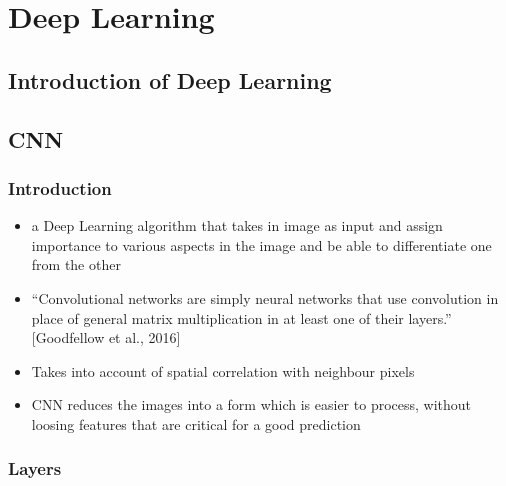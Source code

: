 \documentclass{tron}
\begin{document}
\chapter{Deep Learning}
\section{Introduction of Deep Learning}


\newpage
\section{CNN}
\subsection{Introduction}
\begin{remark}[CNN]{}
	\begin{itemize}
		\item a Deep Learning algorithm that takes in image as input and assign importance to various aspects in the image and be able to differentiate one from the other
		\item “Convolutional networks are simply neural networks that use convolution in place of general matrix multiplication in at least one of their layers.” [Goodfellow et al., 2016]
		\item Takes into account of spatial correlation with neighbour pixels
		\item CNN reduces the images into a form which is easier to process, without loosing features that are critical for a good prediction
	\end{itemize}
\end{remark}

\subsection{Layers}
\end{document}
